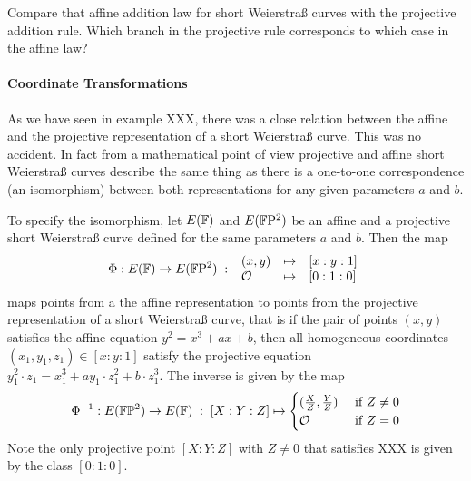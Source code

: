 


\begin{exercise}
Compare that affine addition law for short Weierstraß curves with the projective addition rule. Which branch in the projective rule corresponds to which case in the affine law? 
\end{exercise}

\paragraph{Coordinate Transformations} As we have seen in example XXX, there was a close relation between the affine and the projective representation of a short Weierstraß curve. This was no accident.
In fact from a mathematical point of view projective and affine short Weierstraß curves describe the same thing as there is a one-to-one correspondence (an isomorphism) between both representations for any given parameters $a$ and $b$. 

To specify the isomorphism, let $E(\mathbb{F})$ and $E(\mathbb{F}\mathrm{P}^2)$ be an affine and a projective short Weierstraß curve defined for the same parameters $a$ and $b$. Then the map
\begin{equation}
\Phi : E(\mathbb{F}) \to E(\mathbb{F}\mathrm{P}^2)\;:\;
\begin{array}{lcl}
(x,y)       &\mapsto & [x:y:1]\\
\mathcal{O} &\mapsto & [0:1:0]
\end{array}
\end{equation}
maps points from a the affine representation to points from the projective representation of a short Weierstraß curve, that is if the pair of points $(x,y)$ satisfies the affine equation $y^2= x^3 + ax + b$, then all homogeneous coordinates $(x_1,y_1,z_1)\in [x:y:1]$ satisfy the projective equation $y_1^2\cdot z_1= x_1^3 + ay_1\cdot z_1^2 + b\cdot z_1^3$. The inverse is given by the map
\begin{equation}
\Phi^{-1} : E(\mathbb{F}\mathbb{P}^2)\to E(\mathbb{F}) \;:\; [X:Y:Z] \mapsto \begin{cases}
(\frac{X}{Z},\frac{Y}{Z}) & \text{ if } Z\neq 0\\
\mathcal{O} & \text{ if } Z=0
\end{cases}
\end{equation}
Note the only projective point $[X:Y:Z]$ with $Z\neq 0$ that satisfies XXX is given by the class $[0:1:0]$. 

